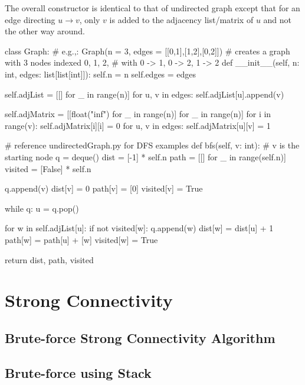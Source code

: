 \noindent The overall constructor is identical to that of undirected graph except that for an edge directing $u \rightarrow v$, only $v$ is added to the adjacency list/matrix of $u$ and not the other way around.

\begin{python}
class Graph:
    # e.g.,: Graph(n = 3, edges = [[0,1],[1,2],[0,2]])
    # creates a graph with 3 nodes indexed 0, 1, 2,
    # with 0 -> 1, 0 -> 2, 1 -> 2
    def __init__(self, n: int, edges: list[list[int]]):
        self.n = n
        self.edges = edges

        self.adjList = [[] for _ in range(n)]
        for u, v in edges:
            self.adjList[u].append(v)

        self.adjMatrix = [[float("inf") for _ in range(n)] for _ in range(n)]
        for i in range(v):
            self.adjMatrix[i][i] = 0
        for u, v in edges:
            self.adjMatrix[u][v] = 1


    # reference undirectedGraph.py for DFS examples
    def bfs(self, v: int):  # v is the starting node
        q = deque()
        dist = [-1] * self.n
        path = [[] for _ in range(self.n)]
        visited = [False] * self.n

        q.append(v)
        dist[v] = 0
        path[v] = [0]
        visited[v] = True

        while q:
            u = q.pop()

            for w in self.adjList[u]:
                if not visited[w]:
                    q.append(w)
                    dist[w] = dist[u] + 1
                    path[w] = path[u] + [w]
                    visited[w] = True

        return dist, path, visited
\end{python}

\section{Strong Connectivity}

\subsection{Brute-force Strong Connectivity Algorithm}

\subsection{Brute-force using Stack}

